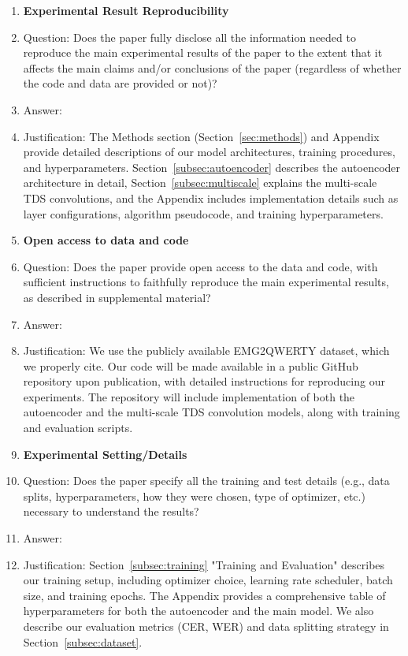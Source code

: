 \begin{enumerate}
    \item {\bf Experimental Result Reproducibility}
    \item[] Question: Does the paper fully disclose all the information needed to reproduce the main experimental results of the paper to the extent that it affects the main claims and/or conclusions of the paper (regardless of whether the code and data are provided or not)?
    \item[] Answer: \answerYes{}
    \item[] Justification: The Methods section (Section~\ref{sec:methods}) and Appendix provide detailed descriptions of our model architectures, training procedures, and hyperparameters. Section~\ref{subsec:autoencoder} describes the autoencoder architecture in detail, Section~\ref{subsec:multiscale} explains the multi-scale TDS convolutions, and the Appendix includes implementation details such as layer configurations, algorithm pseudocode, and training hyperparameters.

    \item {\bf Open access to data and code}
    \item[] Question: Does the paper provide open access to the data and code, with sufficient instructions to faithfully reproduce the main experimental results, as described in supplemental material?
    \item[] Answer: \answerYes{}
    \item[] Justification: We use the publicly available EMG2QWERTY dataset, which we properly cite. Our code will be made available in a public GitHub repository upon publication, with detailed instructions for reproducing our experiments. The repository will include implementation of both the autoencoder and the multi-scale TDS convolution models, along with training and evaluation scripts.

    \item {\bf Experimental Setting/Details}
    \item[] Question: Does the paper specify all the training and test details (e.g., data splits, hyperparameters, how they were chosen, type of optimizer, etc.) necessary to understand the results?
    \item[] Answer: \answerYes{}
    \item[] Justification: Section~\ref{subsec:training} "Training and Evaluation" describes our training setup, including optimizer choice, learning rate scheduler, batch size, and training epochs. The Appendix provides a comprehensive table of hyperparameters for both the autoencoder and the main model. We also describe our evaluation metrics (CER, WER) and data splitting strategy in Section~\ref{subsec:dataset}.


\end{enumerate}
